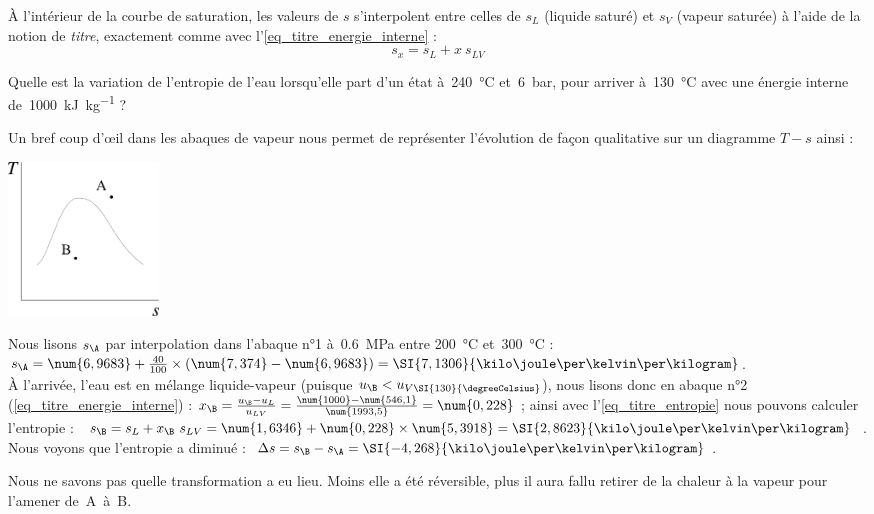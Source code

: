 	
		À l’intérieur de la courbe de saturation, les valeurs de $s$ s’interpolent entre celles de $s_L$ (liquide saturé) et $s_V$ (vapeur saturée) à l’aide de la notion de \emph{titre}, exactement comme avec l’\cref{eq_titre_energie_interne} :
		\begin{equation}
			s_x = s_L + x \ s_{LV}
			\label{eq_titre_entropie}
		\end{equation}
	
		\clearfloats
		\begin{anexample}
			Quelle est la variation de l’entropie de l’eau lorsqu’elle part d’un état à~\SI{240}{\degreeCelsius} et~\SI{6}{\bar}, pour arriver à~\SI{130}{\degreeCelsius} avec une énergie interne de~\SI{1000}{\kilo\joule\per\kilogram} ?%
			
				\begin{answer}
					Un bref coup d’œil dans les abaques de vapeur nous permet de représenter l’évolution de façon qualitative sur un diagramme $T-s$ ainsi :
						\begin{center}\includegraphics[width=4cm]{images/exe_ts_4.png}\end{center}
					Nous lisons $s_\A$ par interpolation dans l’abaque n°1 à~\SI{0,6}{\mega\pascal} entre \SI{200}{\degreeCelsius} et~\SI{300}{\degreeCelsius} : $s_\A= \num{6,9683} + \frac{40}{100}\times(\num{7,374}-\num{6,9683}) = \SI{7,1306}{\kilo\joule\per\kelvin\per\kilogram} $.\\
					À l’arrivée, l’eau est en mélange liquide-vapeur (puisque $u_\B<u_{V\SI{130}{\degreeCelsius}}$), nous lisons donc en abaque n°2 (\ref{eq_titre_energie_interne}) : $x_\B = \frac{u_\B - u_L}{u_{LV}} = \frac{\num{1000}-\num{546,1}}{\num{1993,5}}= \num{0,228} $ ; ainsi avec l’\cref{eq_titre_entropie} nous pouvons calculer l’entropie : $s_\B= s_L + x_\B \ s_{LV} = \num{1,6346}+ \num{0,228}\times\num{5,3918} = \SI{2,8623}{\kilo\joule\per\kelvin\per\kilogram}$.\\
					Nous voyons que l’entropie a diminué : $\Delta s = s_\B - s_\A = \SI{-4,268}{\kilo\joule\per\kelvin\per\kilogram} $.
				
				\begin{remark}Nous ne savons pas quelle transformation a eu lieu. Moins elle a été réversible, plus il aura fallu retirer de la chaleur à la vapeur pour l’amener de~A~à~B.\end{remark}\end{answer}
		\end{anexample}

